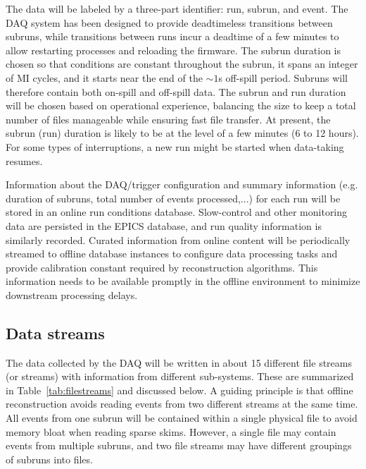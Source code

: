 The data will be labeled by a three-part identifier: run, subrun, and event. The DAQ system has been designed to provide deadtimeless transitions between subruns, while transitions between runs incur a deadtime of a few minutes to allow restarting processes and reloading the firmware. The subrun duration is chosen so that conditions are constant throughout the subrun, it spans an integer of MI cycles, and it starts near the end of the $\sim 1$s off-spill period. Subruns will therefore contain both on-spill and off-spill data. The subrun and run duration will be chosen based on operational experience, balancing the size to keep a total number of files manageable while ensuring fast file transfer. At present, the subrun (run) duration is likely to be at the level of a few minutes (6 to 12 hours). For some types of interruptions, a new run might be started when data-taking resumes.

Information about the DAQ/trigger configuration and summary information (e.g. duration of subruns, total number of events processed,...) for each run will be stored in an online run conditions database. Slow-control and other monitoring data are persisted in the EPICS database, and run quality information is similarly recorded. Curated information from online content will be periodically streamed to offline database instances to configure data processing tasks and provide calibration constant required by reconstruction algorithms. This information needs to be available promptly in the offline environment to minimize downstream processing delays. 


\subsection{Data streams}
The data collected by the DAQ will be written in about 15 different file streams (or streams) with information from different sub-systems. These are summarized in Table~\ref{tab:filestreams} and discussed below. A guiding principle is that offline reconstruction avoids reading events from two different streams at the same time. All events from one subrun will be contained within a single physical file to avoid memory bloat when reading sparse skims. However, a single file may contain events from multiple subruns, and two file streams may have different groupings of subruns into files.

